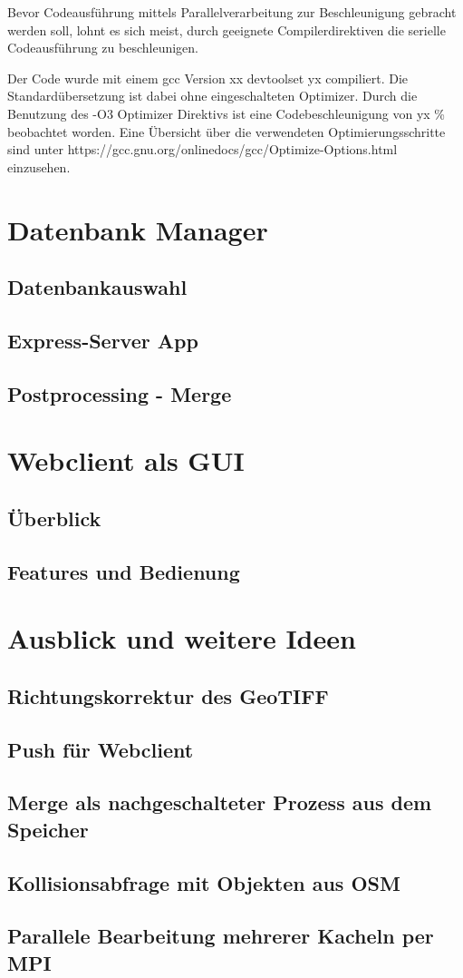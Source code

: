 \documentclass[10pt,a4paper]{report}
\begin{document}
Bevor Codeausführung mittels Parallelverarbeitung zur Beschleunigung gebracht werden soll, lohnt es sich meist, durch geeignete Compilerdirektiven die serielle Codeausführung zu beschleunigen.

Der Code wurde mit einem gcc Version xx devtoolset yx compiliert. Die Standardübersetzung ist dabei ohne eingeschalteten Optimizer. 
Durch die Benutzung des -O3 Optimizer Direktivs ist eine Codebeschleunigung von yx \% beobachtet worden. 
Eine Übersicht über die verwendeten Optimierungsschritte sind unter https://gcc.gnu.org/onlinedocs/gcc/Optimize-Options.html einzusehen.

\chapter{Datenbank Manager}
\section{Datenbankauswahl}
\section{Express-Server App}
\section{Postprocessing - Merge}

\chapter{Webclient als GUI}
\section{Überblick}
\section{Features und Bedienung}
  
\chapter{Ausblick und weitere Ideen}
\section{Richtungskorrektur des GeoTIFF}
\section{Push für Webclient}
\section{Merge als nachgeschalteter Prozess aus dem Speicher}
\section{Kollisionsabfrage mit Objekten aus OSM}
\section{Parallele Bearbeitung mehrerer Kacheln per MPI}
\end{document}
